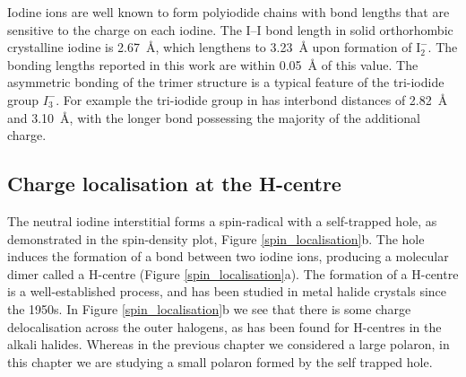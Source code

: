 Iodine ions are well known to form polyiodide chains with bond lengths that are sensitive to the charge on each iodine.
The I--I bond length in solid orthorhombic crystalline iodine is \SI{2.67}{\angstrom}, which lengthens to \SI{3.23}{\angstrom} upon formation of $\mathrm{I}_2^-$.\autocite{Chen1985} The bonding lengths reported in this work are within \SI{0.05}{\angstrom} of this value.
The asymmetric bonding of the trimer structure is a typical feature of the tri-iodide group $I_3^-$. For example the tri-iodide group in  has interbond distances of \SI{2.82}{\angstrom} and \SI{3.10}{\angstrom}, with the longer bond possessing the majority of the additional charge.\autocite{Finney1973}

\subsection{Charge localisation at the H-centre} \label{ss:chglocal}
The neutral iodine interstitial forms a spin-radical with a self-trapped hole, as demonstrated in the spin-density plot, Figure \ref{spin_localisation}b.
The hole induces the formation of a bond between two iodine ions, producing a molecular dimer called a H-centre (Figure \ref{spin_localisation}a). The formation of a H-centre is a well-established process, and has been studied in metal halide crystals since the 1950s.\autocite{Castner1957} In Figure \ref{spin_localisation}b we see that there is some charge delocalisation across the outer halogens, as has been found for H-centres in the alkali halides.\autocite{Shluger1995}
Whereas in the previous chapter we considered a large polaron, in this chapter we are studying a small polaron formed by the self trapped hole.

